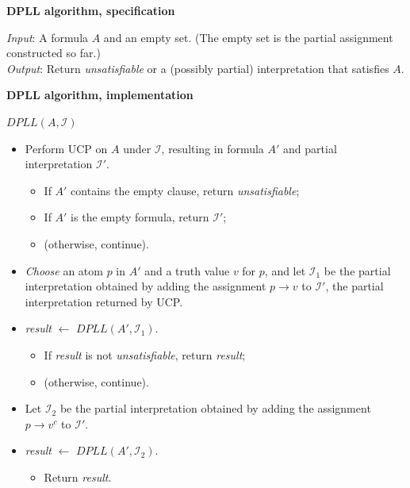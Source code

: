 \documentclass[11pt]{report}
\begin{document}
\bigskip

\textbf{DPLL algorithm, specification}

\textit{Input}: A formula $A$ and an empty set. (The empty set is the partial assignment constructed so far.)\\
\textit{Output}: Return \emph{unsatisfiable} or a (possibly partial)
interpretation that satisfies $A$.

\bigskip

\textbf{DPLL algorithm, implementation}

\noindent $\textit{DPLL}(A,\mathcal{I})$
\begin{itemize}

\item Perform UCP on $A$ under $\mathcal{I}$, resulting in formula $A'$ and partial interpretation $\mathcal{I}'$.

\begin{itemize}
\item If $A'$ contains the empty clause, return \emph{unsatisfiable};
\item If $A'$ is the empty formula, return $\mathcal{I}'$;
\item (otherwise, continue).
\end{itemize}
\item \emph{Choose} an atom $p$ in $A'$ and a truth value $\textit{v}$ for $p$, and let $\mathcal{I}_1$ be the partial interpretation obtained by adding the assignment $p\rightarrow \textit{v}$  to $\mathcal{I}'$, the partial interpretation returned by UCP.

\item \textit{result} $\leftarrow$ $\textit{DPLL}(A',\mathcal{I}_1)$.
\begin{itemize}
\item If \textit{result} is not \emph{unsatisfiable}, return \textit{result};
\item (otherwise, continue).
\end{itemize}

\item Let $\mathcal{I}_2$ be the partial interpretation obtained by
adding the assignment $p\rightarrow \textit{v}^c$ to
$\mathcal{I}'$.

\item \textit{result} $\leftarrow$ $\textit{DPLL}(A',\mathcal{I}_2)$.
\begin{itemize}
\item Return \textit{result}.
\end{itemize}
\end{itemize}
\end{document}
